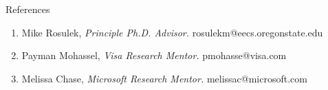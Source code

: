 \documentclass{resume} %
\begin{document}

\begin{rSection}{References}
	
	\begin{enumerate}[label=R\arabic*]
		
		\item Mike Rosulek, \emph{Principle Ph.D. Advisor.} rosulekm@eecs.oregonstate.edu
		
		\item Payman Mohassel,  \emph{Visa Research Mentor.} pmohasse@visa.com
		
		\item Melissa Chase, \emph{Microsoft Research Mentor.} melissac@microsoft.com
		
		
	\end{enumerate}
	
\end{rSection}






\end{document}

